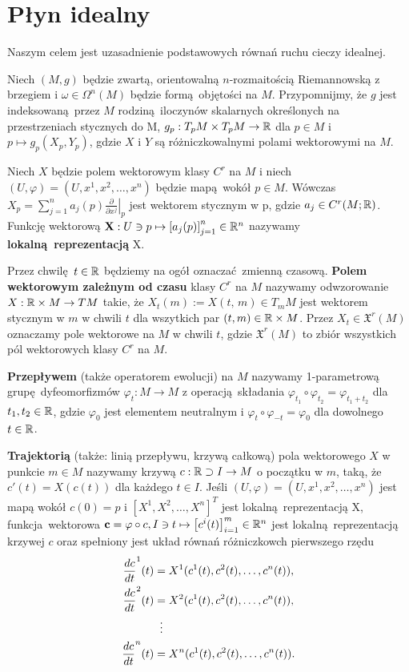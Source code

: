 \chapter{Płyn idealny} Naszym celem jest uzasadnienie podstawowych równań ruchu cieczy idealnej. 

Niech \((M, g)\) będzie zwartą, orientowalną \(n\)-rozmaitością Riemannowską z brzegiem i \(\omega \in \Omega^n(M)\) będzie formą objętości na \(M\). Przypomnijmy, że \(g\) jest indeksowaną przez \(M\) rodziną iloczynów skalarnych określonych na przestrzeniach stycznych do M, \(g_p: T_p M \times T_p M \rightarrow \mathbb{R}\) dla \(p\in M\) i \(p\mapsto g_p(X_p, Y_p)\), gdzie \(X\) i \(Y\) są różniczkowalnymi polami wektorowymi na \(M\).

Niech \(X\) będzie polem wektorowym klasy \(C^r\) na \(M\) i niech \((U, \varphi) = (U, x^1, x^2, \dots, x^n)\) będzie mapą wokół \(p\in M\). Wówczas \(X_p = \sum_{j=1}^{n}a_j(p)\left.\frac{\partial}{\partial x^j}\right|_p\) jest wektorem stycznym w p, gdzie \(a_j\in C^r(M; \mathbb{R})\). Funkcję wektorową \(\mathbf{X}: U\ni p \mapsto \left[a_j(p)\right]_{j=1}^n\in \mathbb{R}^n\) nazywamy \textbf{lokalną reprezentacją} X.

Przez chwilę \(t\in\mathbb{R}\) będziemy na ogół oznaczać zmienną czasową. \textbf{Polem wektorowym zależnym od czasu} klasy \(C^r\) na \(M\) nazywamy odwzorowanie \(X:\mathbb{R}\times M\rightarrow TM\) takie, że \(X_t(m):=X(t,\,m) \in T_{m} M\) jest wektorem stycznym w \(m\) w chwili \(t\) dla wszytkich par \((t, m) \in \mathbb{R} \times M\). Przez \(X_t\in \mathfrak{X}^r(M)\) oznaczamy pole wektorowe na \(M\) w chwili \(t\), gdzie \(\mathfrak{X}^r(M)\) to zbiór wszystkich pól wektorowych klasy \(C^r\) na \(M\). 

\textbf{Przepływem} (także operatorem ewolucji) na \(M\) nazywamy 1-parametrową grupę dyfeomorfizmów \(\varphi_t: M \rightarrow M\) z operacją składania \(\varphi_{t_1}\circ\varphi_{t_2} = \varphi_{t_1 + t_2}\) dla \(t_{1}, {t}_2 \in \mathbb{R}\), gdzie \(\varphi_0\) jest elementem neutralnym i \(\varphi_{t}\circ\varphi_{-t} = \varphi_0\) dla dowolnego \(t\in\mathbb{R}\).  

\textbf{Trajektorią} (także: linią przepływu, krzywą całkową) pola wektorowego \(X\) w punkcie \(m\in M\) nazywamy krzywą \(c: \mathbb{R} \supset I \rightarrow M\) o początku w \(m\), taką, że \(c'(t) = X(c(t))\) dla każdego \(t\in I\). Jeśli \((U, \varphi) = (U, x^1, x^2, \dots, x^n)\) jest mapą wokół \(c(0)=p\) i \([X^1, X^2, \dots, X^n]^T\) jest lokalną reprezentacją X, funkcja wektorowa \(\mathbf{c} = \varphi \circ c, I \ni t \mapsto \left[c^i(t)\right]_{i=1}^m \in \mathbb{R}^n\) jest lokalną reprezentacją krzywej \(c\) oraz spełniony jest układ równań różniczkowch pierwszego rzędu
\begin{align*}
    \frac{dc}{dt}^1(t) &= X^1(c^1(t), c^2(t), \dots, c^n(t)),\\
    \frac{dc}{dt}^2(t) &= X^2(c^1(t), c^2(t), \dots, c^n(t)),\\
    &\mathrel{\makebox[\widthof{=}]{\vdots}}  \\
    \frac{dc}{dt}^n(t) &= X^n(c^1(t), c^2(t), \dots, c^n(t)).
\end{align*}

